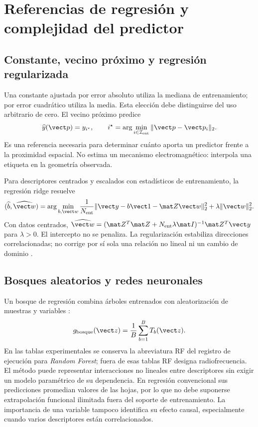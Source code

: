 \section{Referencias de regresión y complejidad del predictor}

\subsection{Constante, vecino próximo y regresión regularizada}

Una constante ajustada por error absoluto utiliza la mediana de entrenamiento; por error
cuadrático utiliza la media. Esta elección debe distinguirse del uso arbitrario de cero.
El vecino próximo predice
\begin{equation}
\widehat y(\vect p)=y_{i^\star},\qquad
i^\star=\arg\min_{i\in\mathcal I_{\rm ent}}\|\vect p-\vect p_i\|_2.
\end{equation}
Es una referencia necesaria para determinar cuánto aporta un predictor frente a la
proximidad espacial. No estima un mecanismo electromagnético: interpola una etiqueta
en la geometría observada.

Para descriptores centrados y escalados con estadísticos de entrenamiento, la regresión
ridge resuelve
\begin{equation}
(\widehat b,\widehat{\vect w})=
\arg\min_{b,\vect w}\frac{1}{N_{\rm ent}}
\|\vect y-b\vect 1-\mat Z\vect w\|_2^2+\lambda\|\vect w\|_2^2.
\label{eq:ridge_model}
\end{equation}
Con datos centrados, $\widehat{\vect w}=(\mat Z^T\mat Z+
N_{\rm ent}\lambda\mat I)^{-1}\mat Z^T\vect y$ para $\lambda>0$.
El intercepto no se penaliza. La regularización estabiliza direcciones correlacionadas;
no corrige por sí sola una relación no lineal ni un cambio de dominio
\citep{Bishop2006PRML,Boyd2004Convex}.

\subsection{Bosques aleatorios y redes neuronales}

Un bosque de regresión combina árboles entrenados con aleatorización de muestras y
variables \citep{Breiman2001RandomForests}:
\begin{equation}
g_{\rm bosque}(\vect z)=\frac{1}{B}\sum_{b=1}^{B}T_b(\vect z).
\end{equation}
En las tablas experimentales se conserva la abreviatura RF del registro de ejecución
para \emph{Random Forest}; fuera de esas tablas RF designa radiofrecuencia. El método
puede representar interacciones no lineales entre descriptores sin exigir un modelo
paramétrico de su dependencia. En regresión convencional sus predicciones promedian
valores de las hojas, por lo que no debe suponerse extrapolación funcional ilimitada
fuera del soporte de entrenamiento. La importancia de una variable tampoco identifica
su efecto causal, especialmente cuando varios descriptores están correlacionados.

